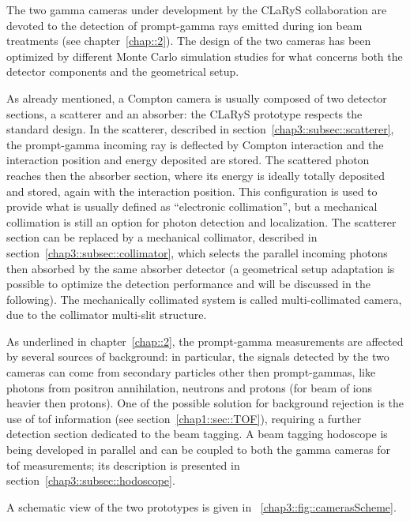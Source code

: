 The two gamma cameras under development by the CLaRyS collaboration are devoted to the detection of prompt-gamma rays emitted during ion beam treatments (see chapter~\ref{chap::2}). The design of the two cameras has been optimized by different Monte Carlo simulation studies for what concerns both the detector components and the geometrical setup.

As already mentioned, a Compton camera is usually composed of two detector sections, a scatterer and an absorber: the CLaRyS prototype respects the standard design. In the scatterer, described in section~\ref{chap3::subsec::scatterer}, the prompt-gamma incoming ray is deflected by Compton interaction and the interaction position and energy deposited are stored. The scattered photon reaches then the absorber section, where its energy is ideally totally deposited and stored, again with the interaction position. This configuration is used to provide what is usually defined as \enquote{electronic collimation}, but a mechanical collimation is still an option for photon detection and localization. The scatterer section can be replaced by a mechanical collimator, described in section~\ref{chap3::subsec::collimator}, which selects the parallel incoming photons then absorbed by the same absorber detector (a geometrical setup adaptation is possible to optimize the detection performance and will be discussed in the following). The mechanically collimated system is called multi-collimated camera, due to the collimator multi-slit structure.

As underlined in chapter~\ref{chap::2}, the prompt-gamma measurements are affected by several sources of background: in particular, the signals detected by the two cameras can come from secondary particles other then prompt-gammas, like photons from positron annihilation, neutrons and protons (for beam of ions heavier then protons). One of the possible solution for background rejection is the use of \gls{tof} information (see section~\ref{chap1::sec::TOF}), requiring a further detection section dedicated to the beam tagging. A beam tagging hodoscope is being developed in parallel and can be coupled to both the gamma cameras for \gls{tof} measurements; its description is presented in section~\ref{chap3::subsec::hodoscope}.

A schematic view of the two prototypes is given in \figurename~\ref{chap3::fig::camerasScheme}.

